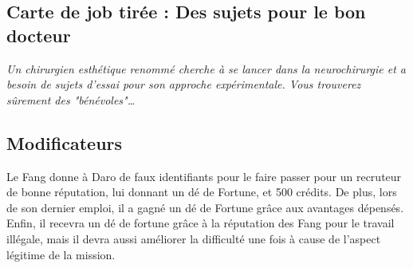 \documentclass{article}
\begin{document}
\subsection*{Carte de job tirée : Des sujets pour le bon docteur}
\textit{Un chirurgien esthétique renommé cherche à se lancer dans la neurochirurgie et a besoin de sujets d'essai pour son approche expérimentale. Vous trouverez sûrement des "bénévoles"\ldots}

\subsection*{Modificateurs} Le Fang donne à Daro de faux identifiants pour le faire passer pour un recruteur de bonne réputation, lui donnant un dé de Fortune, et 500 crédits. De plus, lors de son dernier emploi, il a gagné un dé de Fortune grâce aux avantages dépensés. Enfin, il recevra un dé de fortune grâce à la réputation des Fang pour le travail illégale, mais il devra aussi améliorer la difficulté une fois à cause de l’aspect légitime de la mission.
\end{document}
